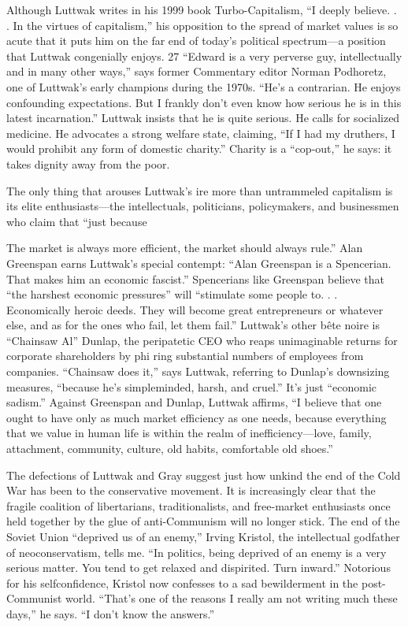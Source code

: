  \par 
Although Luttwak writes in his 1999 book Turbo-Capitalism, “I deeply believe. . . In the virtues of capitalism,” his opposition to the spread of market values is so acute that it puts him on the far end of today’s political spectrum—a position that Luttwak congenially enjoys. {\color{blue}27} “Edward is a very perverse guy, intellectually and in many other ways,” says former Commentary editor Norman Podhoretz, one of Luttwak’s early champions during the 1970s. “He’s a contrarian. He enjoys confounding expectations. But I frankly don’t even know how serious he is in this latest incarnation.” Luttwak insists that he is quite serious. He calls for socialized medicine. He advocates a strong welfare state, claiming, “If I had my druthers, I would prohibit any form of domestic charity.” Charity is a “cop-out,” he says: it takes dignity away from the poor.
 \par 
The only thing that arouses Luttwak’s ire more than untrammeled capitalism is its elite enthusiasts—the intellectuals, politicians, policymakers, and businessmen who claim that “just because
 \par 
The market is always more efficient, the market should always rule.” Alan Greenspan earns Luttwak’s special contempt: “Alan Greenspan is a Spencerian. That makes him an economic fascist.” Spencerians like Greenspan believe that “the harshest economic pressures” will “stimulate some people to. . . Economically heroic deeds. They will become great entrepreneurs or whatever else, and as for the ones who fail, let them fail.” Luttwak’s other bête noire is “Chainsaw Al” Dunlap, the peripatetic CEO who reaps unimaginable returns for corporate shareholders by phi ring substantial numbers of employees from companies. “Chainsaw does it,” says Luttwak, referring to Dunlap’s downsizing measures, “because he’s simpleminded, harsh, and cruel.” It’s just “economic sadism.” Against Greenspan and Dunlap, Luttwak affirms, “I believe that one ought to have only as much market efficiency as one needs, because everything that we value in human life is within the realm of inefficiency—love, family, attachment, community, culture, old habits, comfortable old shoes.”
 \par 
The defections of Luttwak and Gray suggest just how unkind the end of the Cold War has been to the conservative movement. It is increasingly clear that the fragile coalition of libertarians, traditionalists, and free-market enthusiasts once held together by the glue of anti-Communism will no longer stick. The end of the Soviet Union “deprived us of an enemy,” Irving Kristol, the intellectual godfather of neoconservatism, tells me. “In politics, being deprived of an enemy is a very serious matter. You tend to get relaxed and dispirited. Turn inward.” Notorious for his selfconfidence, Kristol now confesses to a sad bewilderment in the post-Communist world. “That’s one of the reasons I really am not writing much these days,” he says. “I don’t know the answers.”
